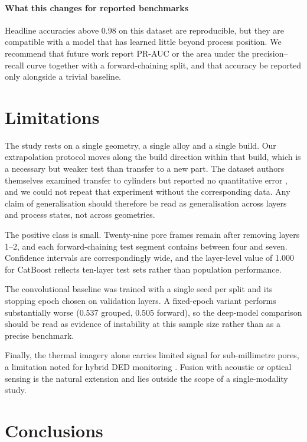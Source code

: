 \documentclass[preprint,12pt]{elsarticle}
\begin{document}
\paragraph{What this changes for reported benchmarks} Headline accuracies above 0.98 on this dataset are reproducible, but they are compatible with a model that has learned little beyond process position. We recommend that future work report PR-AUC or the area under the precision--recall curve together with a forward-chaining split, and that accuracy be reported only alongside a trivial baseline.

\section{Limitations}

The study rests on a single geometry, a single alloy and a single build. Our extrapolation protocol moves along the build direction within that build, which is a necessary but weaker test than transfer to a new part. The dataset authors themselves examined transfer to cylinders but reported no quantitative error \cite{guo2023}, and we could not repeat that experiment without the corresponding data. Any claim of generalisation should therefore be read as generalisation across layers and process states, not across geometries.

The positive class is small. Twenty-nine pore frames remain after removing layers 1--2, and each forward-chaining test segment contains between four and seven. Confidence intervals are correspondingly wide, and the layer-level value of 1.000 for CatBoost reflects ten-layer test sets rather than population performance.

The convolutional baseline was trained with a single seed per split and its stopping epoch chosen on validation layers. A fixed-epoch variant performs substantially worse (0.537 grouped, 0.505 forward), so the deep-model comparison should be read as evidence of instability at this sample size rather than as a precise benchmark.

Finally, the thermal imagery alone carries limited signal for sub-millimetre pores, a limitation noted for hybrid DED monitoring \cite{farea2025}. Fusion with acoustic or optical sensing is the natural extension and lies outside the scope of a single-modality study.

\section{Conclusions}
\end{document}
